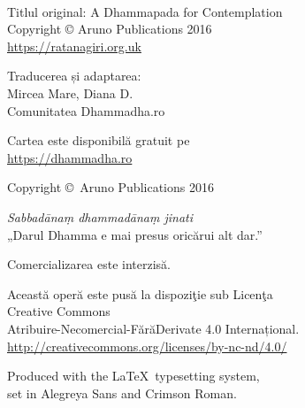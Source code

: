 
\cleartoverso
\thispagestyle{empty}

{\copyrightsize
\centering
\setlength{\parindent}{0pt}%
\setlength{\parskip}{0.8\baselineskip}%

\thetitle\\
\theauthor

Titlul original: A Dhammapada for Contemplation\\
Copyright © Aruno Publications 2016\\
\href{https://ratanagiri.org.uk}{https://ratanagiri.org.uk}

Traducerea și adaptarea:\\
Mircea Mare, Diana D.\\
Comunitatea Dhammadha.ro

Cartea este disponibilă gratuit pe\\
\href{https://dhammadha.ro}{https://dhammadha.ro}


\theEditionInfo

Copyright \copyright\ Aruno Publications 2016

\vfill

\emph{Sabbadānaṃ dhammadānaṃ jinati}\\
„Darul Dhamma e mai presus oricărui alt dar.”

Comercializarea este interzisă.

Această operă este pusă la dispoziţie sub Licenţa\\
Creative Commons\\
Atribuire-Necomercial-FărăDerivate 4.0 Internațional.\\
\href{http://creativecommons.org/licenses/by-nc-nd/4.0/}{http://creativecommons.org/licenses/by-nc-nd/4.0/}

Produced with the \LaTeX\ typesetting system,\\
set in Alegreya Sans and Crimson Roman.

}
